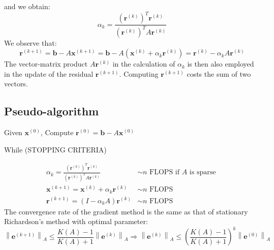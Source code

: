 \documentclass[11pt]{book}
\begin{document}
and we obtain:
$$
\alpha_{k}=\frac{\left(\boldsymbol{r}^{(k)}\right)^{T} \boldsymbol{r}^{(k)}}{\left(\boldsymbol{r}^{(k)}\right)^{T} A \boldsymbol{r}^{(k)}}
$$
We observe that:
$$
\mathbf{r}^{(k+1)}=\mathbf{b}-A \mathbf{x}^{(k+1)}=\mathbf{b}-A\left(\mathbf{x}^{(k)}+\alpha_{k} \mathbf{r}^{(k)}\right)=\mathbf{r}^{(k)}-\alpha_{k} A \mathbf{r}^{(k)}
$$
The vector-matrix product $A \mathbf{r}^{(k)}$ in the calculation of $\alpha_{k}$ is then also employed in the update of the residual $\mathbf{r}^{(k+1)}$. Computing $\mathbf{r}^{(k+1)}$ costs the sum of two vectors.

\subsection*{Pseudo-algorithm}
Given $\mathbf{x}^{(0)}$, Compute $\mathbf{r}^{(0)}=\mathbf{b}-A \mathbf{x}^{(0)}$

While (STOPPING CRITERIA)

$$
\begin{array}{ll}
\alpha_{k}=\frac{\left(\boldsymbol{r}^{(k)}\right)^{T} \boldsymbol{r}^{(k)}}{\left(\boldsymbol{r}^{(k)}\right)^{T} A \boldsymbol{r}^{(k)}} & \sim n \text { FLOPS if } A \text { is sparse } \\
\boldsymbol{x}^{(k+1)}=\boldsymbol{x}^{(k)}+\alpha_{k} \boldsymbol{r}^{(k)} & \sim n \text { FLOPS } \\
\boldsymbol{r}^{(k+1)}=\left(I-\alpha_{k} A\right) \boldsymbol{r}^{(k)} & \sim n \text { FLOPS }
\end{array}
$$
The convergence rate of the gradient method is the same as that of stationary Richardson's method with optimal parameter:
$$
\left\|\boldsymbol{e}^{(k+1)}\right\|_{A} \leq \frac{K(A)-1}{K(A)+1}\left\|\boldsymbol{e}^{(k)}\right\|_{A} \Longrightarrow\left\|\boldsymbol{e}^{(k)}\right\|_{A} \leq\left(\frac{K(A)-1}{K(A)+1}\right)^{k}\left\|\boldsymbol{e}^{(0)}\right\|_{A}
$$
\end{document}

